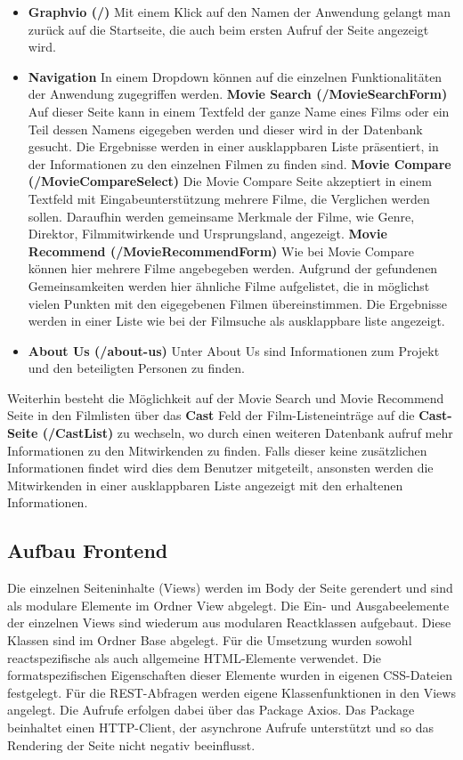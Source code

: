\documentclass[conference]{IEEEtran}
\begin{document}
\begin{itemize}
    \item \textbf{Graphvio (/)}
    Mit einem Klick auf den Namen der Anwendung gelangt man zurück auf die Startseite, die auch beim ersten Aufruf der Seite angezeigt wird.
    \smallskip
    \item \textbf{Navigation} 
    In einem Dropdown können auf die einzelnen Funktionalitäten der Anwendung zugegriffen werden.
    \smallskip
    \subitem \textbf{Movie Search (/MovieSearchForm)}
    Auf dieser Seite kann in einem Textfeld der ganze Name eines Films oder ein Teil dessen Namens eigegeben werden und dieser wird in der Datenbank gesucht. 
    Die Ergebnisse werden in einer ausklappbaren Liste präsentiert, in der Informationen zu den einzelnen Filmen zu finden sind.
    \smallskip
    \subitem \textbf{Movie Compare (/MovieCompareSelect)}
    Die Movie Compare Seite akzeptiert in einem Textfeld mit Eingabeunterstützung mehrere Filme, die Verglichen werden sollen. 
    Daraufhin werden gemeinsame Merkmale der Filme, wie Genre, Direktor, Filmmitwirkende und Ursprungsland, angezeigt.
    \smallskip
    \subitem \textbf{Movie Recommend (/MovieRecommendForm)}
    Wie bei Movie Compare können hier mehrere Filme angebegeben werden. Aufgrund der gefundenen Gemeinsamkeiten werden hier ähnliche Filme aufgelistet, die in möglichst vielen Punkten mit den eigegebenen Filmen übereinstimmen. Die Ergebnisse werden in einer Liste wie bei der Filmsuche als ausklappbare liste angezeigt. 
    \smallskip
    \item \textbf{About Us (/about-us)}
    Unter About Us sind Informationen zum Projekt und den beteiligten Personen zu finden.
\end{itemize}

Weiterhin besteht die Möglichkeit auf der Movie Search und Movie Recommend Seite in den Filmlisten über das \textbf{Cast} Feld der Film-Listeneinträge auf die  \textbf{Cast-Seite (/CastList)} zu wechseln, wo durch einen weiteren Datenbank aufruf mehr Informationen zu den Mitwirkenden zu finden. Falls dieser keine zusätzlichen Informationen findet wird dies dem Benutzer mitgeteilt, ansonsten werden die Mitwirkenden in einer ausklappbaren Liste angezeigt mit den erhaltenen Informationen.  

\subsection{Aufbau Frontend}

Die einzelnen Seiteninhalte (Views) werden im Body der Seite gerendert 
und sind als modulare Elemente im Ordner View abgelegt. 
Die Ein- und Ausgabeelemente der einzelnen Views sind wiederum aus modularen Reactklassen aufgebaut.
Diese Klassen sind im Ordner Base abgelegt. Für die Umsetzung wurden sowohl reactspezifische als auch 
allgemeine HTML-Elemente verwendet.
Die formatspezifischen Eigenschaften dieser Elemente wurden in eigenen CSS-Dateien festgelegt.
Für die REST-Abfragen werden eigene Klassenfunktionen in den Views angelegt.
Die Aufrufe erfolgen dabei über das Package Axios.\cite{axios}
Das Package beinhaltet einen HTTP-Client, 
der asynchrone Aufrufe unterstützt und so das Rendering der Seite nicht negativ beeinflusst.
\end{document}
